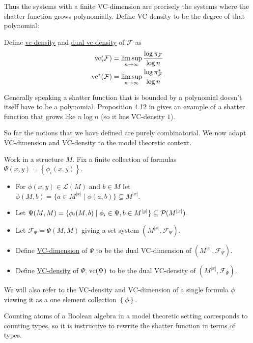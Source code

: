 \documentclass{amsart}
\newcommand{\F}{\mathcal F}
\renewcommand{\LL}{\mathcal L}
\newcommand{\curly}[1]{\left\{#1\right\}}
\newcommand{\defn}{\underline}
\begin{document}
Thus the systems with a finite VC-dimension are precisely the systems where the shatter function grows polynomially.
Define VC-density to be the degree of that polynomial:
\begin{Definition}
  Define \defn{vc-density} and \defn{dual vc-density} of $\F$ as
  \begin{align*}
    \vc(\F) &= \limsup_{n \to \infty}\frac{\log \pi_\F}{\log n}\\%
    \vc^*(\F) &= \limsup_{n \to \infty}\frac{\log \pi^*_\F}{\log n}%
  \end{align*}
\end{Definition}

Generally speaking a shatter function that is bounded by a polynomial doesn't itself have to be a polynomial.
Proposition 4.12 in \cite{density} gives an example of a shatter function that grows like $n \log n$ (so it has VC-density $1$).

So far the notions that we have defined are purely combinatorial.
We now adapt VC-dimension and VC-density to the model theoretic context.

\begin{Definition}
  Work in a structure $M$.
  Fix a finite collection of formulas $\Psi(x, y) = \curly{\phi_i(x, y)}$.

  \begin{itemize}
  \item For $\phi(x, y) \in \LL(M)$ and $b \in M$ let $\phi(M, b) = \{a \in M^{|x|} \mid \phi(a, b)\} \subseteq M^{|x|}$.
  \item Let $\Psi(M, M)= \{\phi_i(M, b) \mid \phi_i \in \Psi, b \in M^{|y|}\} \subseteq \mathcal P(M^{|x|})$.
  \item Let $\F_\Psi = \Psi(M, M)$ giving a set system $(M^{|x|}, \F_\Psi)$.
  \item Define \defn{VC-dimension} of $\Psi$ to be the dual VC-dimension of $(M^{|x|}, \F_\Psi)$.
  \item Define \defn{VC-density} of $\Psi$, $\operatorname{vc}(\Psi)$ to be the dual VC-density of $(M^{|x|}, \F_\Psi)$.
  \end{itemize}

  We will also refer to the VC-density and VC-dimension of a single formula $\phi$
  viewing it as a one element collection $\curly{\phi}$.
\end{Definition}

Counting atoms of a Boolean algebra in a model theoretic setting corresponds to counting types,
so it is instructive to rewrite the shatter function in terms of types.
\end{document}
